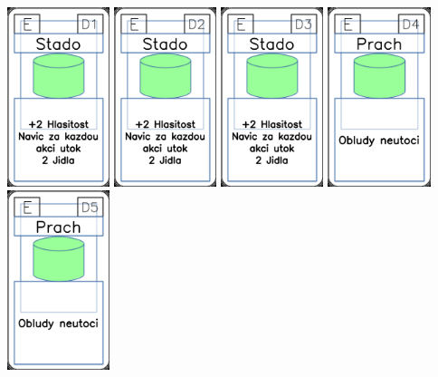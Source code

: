 \documentclass[a4paper]{article}
\begin{document}
	\includegraphics[width=3.0cm]{img-4_45}
	\includegraphics[width=3.0cm]{img-4_46}
	\includegraphics[width=3.0cm]{img-4_47}
	\includegraphics[width=3.0cm]{img-4_48}
	\includegraphics[width=3.0cm]{img-4_49}
\end{document}
